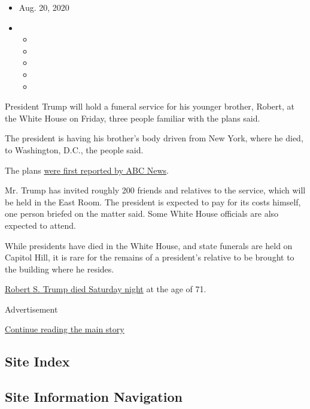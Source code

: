 \begin{itemize}
\item
  Aug. 20, 2020
\item
  \begin{itemize}
  \item
  \item
  \item
  \item
  \item
  \end{itemize}
\end{itemize}

President Trump will hold a funeral service for his younger brother,
Robert, at the White House on Friday, three people familiar with the
plans said.

The president is having his brother's body driven from New York, where
he died, to Washington, D.C., the people said.

The plans
\href{https://abcnews.go.com/Politics/donald-trump-host-funeral-brother-robert-trump-white/story?id=72484552}{were
first reported by ABC News}.

Mr. Trump has invited roughly 200 friends and relatives to the service,
which will be held in the East Room. The president is expected to pay
for its costs himself, one person briefed on the matter said. Some White
House officials are also expected to attend.

While presidents have died in the White House, and state funerals are
held on Capitol Hill, it is rare for the remains of a president's
relative to be brought to the building where he resides.

\href{https://www.nytimes3xbfgragh.onion/2020/08/15/us/politics/robert-s-trump-dead.html}{Robert
S. Trump died Saturday night} at the age of 71.

Advertisement

\protect\hyperlink{after-bottom}{Continue reading the main story}

\hypertarget{site-index}{%
\subsection{Site Index}\label{site-index}}

\hypertarget{site-information-navigation}{%
\subsection{Site Information
Navigation}\label{site-information-navigation}}


